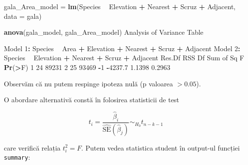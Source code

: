 \documentclass[]{article}
\newenvironment{Shaded}{\begin{snugshade}}{\end{snugshade}}
\newcommand{\KeywordTok}[1]{\textcolor[rgb]{0.13,0.29,0.53}{\textbf{#1}}}
\newcommand{\DataTypeTok}[1]{\textcolor[rgb]{0.13,0.29,0.53}{#1}}
\newcommand{\DecValTok}[1]{\textcolor[rgb]{0.00,0.00,0.81}{#1}}
\newcommand{\FloatTok}[1]{\textcolor[rgb]{0.00,0.00,0.81}{#1}}
\newcommand{\StringTok}[1]{\textcolor[rgb]{0.31,0.60,0.02}{#1}}
\newcommand{\OperatorTok}[1]{\textcolor[rgb]{0.81,0.36,0.00}{\textbf{#1}}}
\newcommand{\NormalTok}[1]{#1}
\begin{document}
\begin{Shaded}
\begin{Highlighting}[]
\NormalTok{gala_Area_model =}\StringTok{ }\KeywordTok{lm}\NormalTok{(Species }\OperatorTok{~}\StringTok{ }\NormalTok{Elevation }\OperatorTok{+}\StringTok{ }\NormalTok{Nearest }\OperatorTok{+}\StringTok{ }\NormalTok{Scruz }\OperatorTok{+}\StringTok{ }\NormalTok{Adjacent, }
    \DataTypeTok{data =}\NormalTok{ gala)}

\KeywordTok{anova}\NormalTok{(gala_model, gala_Area_model)}
\NormalTok{Analysis of Variance Table}

\NormalTok{Model }\DecValTok{1}\OperatorTok{:}\StringTok{ }\NormalTok{Species }\OperatorTok{~}\StringTok{ }\NormalTok{Area }\OperatorTok{+}\StringTok{ }\NormalTok{Elevation }\OperatorTok{+}\StringTok{ }\NormalTok{Nearest }\OperatorTok{+}\StringTok{ }\NormalTok{Scruz }\OperatorTok{+}\StringTok{ }\NormalTok{Adjacent}
\NormalTok{Model }\DecValTok{2}\OperatorTok{:}\StringTok{ }\NormalTok{Species }\OperatorTok{~}\StringTok{ }\NormalTok{Elevation }\OperatorTok{+}\StringTok{ }\NormalTok{Nearest }\OperatorTok{+}\StringTok{ }\NormalTok{Scruz }\OperatorTok{+}\StringTok{ }\NormalTok{Adjacent}
\NormalTok{  Res.Df   RSS Df Sum of Sq      F }\KeywordTok{Pr}\NormalTok{(}\OperatorTok{>}\NormalTok{F)}
\DecValTok{1}     \DecValTok{24} \DecValTok{89231}                           
\DecValTok{2}     \DecValTok{25} \DecValTok{93469} \OperatorTok{-}\DecValTok{1}   \OperatorTok{-}\FloatTok{4237.7} \FloatTok{1.1398} \FloatTok{0.2963}
\end{Highlighting}
\end{Shaded}

Observăm că nu putem respinge ipoteza nulă (p valoarea \(>0.05\)).

O abordare alternativă constă în folosirea statisticii de test

\[
t_i = \frac{\hat\beta_i}{\hat{\mathrm{SE}}(\hat\beta_j)}\sim_{H_0} t_{n-k-1}
\]

care verifică relația \(t_i^2 = F\). Putem vedea statistica student în
output-ul funcției \texttt{summary}:
\end{document}
